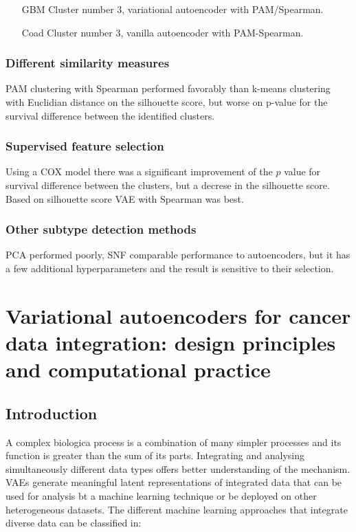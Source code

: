 		\begin{itemize}
			\item[GBM] Cluster number $3$, variational autoencoder with PAM/Spearman.
			\item[Coad] Cluster number $3$, vanilla autoencoder with PAM-Spearman.
		\end{itemize}

		\subsubsection{Different similarity measures}
		PAM clustering with Spearman performed favorably than k-means clustering with Euclidian distance on the silhouette score, but worse on p-value for the survival difference between the identified clusters.

		\subsubsection{Supervised feature selection}
		Using a COX model there was a significant improvement of the $p$ value for survival difference between the clusters, but a decrese in the silhouette score.
		Based on silhouette score VAE with Spearman was best.

		\subsubsection{Other subtype detection methods}
		PCA performed poorly, SNF comparable performance to autoencoders, but it has a few additional hyperparameters and the result is sensitive to their selection.

\section{Variational autoencoders for cancer data integration: design principles and computational practice}

	\subsection{Introduction}
	A complex biologica process is a combination of many simpler processes and its function is greater than the sum of its parts.
	Integrating and analysing simultaneously different data types offers better understanding of the mechanism.
	VAEs generate meaningful latent representations of integrated data that can be used for analysis bt a machine learning technique or be deployed on other heterogeneous datasets.
	The different machine learning approaches that integrate diverse data can be classified in:

